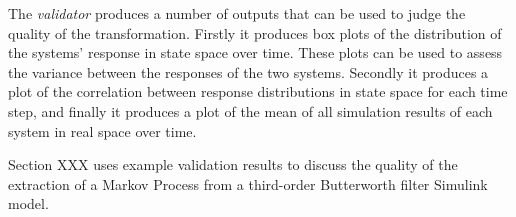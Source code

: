 The \textit{validator} produces a number of outputs that can be used to judge the quality of the transformation. Firstly it produces box plots of the distribution of the systems' response in state space over time. These plots can be used to assess the variance between the responses of the two systems. Secondly it produces a plot of the correlation between response distributions in state space for each time step, and finally it produces a plot of the mean of all simulation results of each system in real space over time.

Section XXX uses example validation results to discuss the quality of the extraction of a Markov Process from a third-order Butterworth filter Simulink model.






